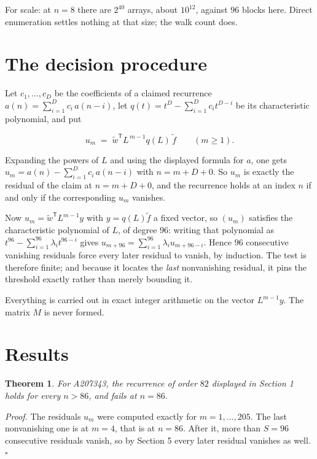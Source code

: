 \documentclass[11pt]{article}
\newtheorem{theorem}{Theorem}
\theoremstyle{definition}
\begin{document}
For scale: at $n = 8$ there are $2^{40}$ arrays, about $10^{12}$, against $96$ blocks here. Direct enumeration settles nothing at that size; the walk count does.

\section{The decision procedure}

Let $c_1,\dots,c_D$ be the coefficients of a claimed recurrence $a(n) = \sum_{i=1}^{D} c_i\,a(n-i)$, let $q(t) = t^{D} - \sum_{i=1}^{D} c_i t^{D-i}$ be its characteristic polynomial, and put

\[u_m \;=\; \tilde w^{\mathsf T} L^{\,m-1} q(L)\,\tilde f \qquad (m \ge 1).\]

Expanding the powers of $L$ and using the displayed formula for $a$, one gets $u_m = a(n) - \sum_{i=1}^{D} c_i\,a(n-i)$ with $n = m + D + 0$. So $u_m$ is exactly the residual of the claim at $n = m + D + 0$, and the recurrence holds at an index $n$ if and only if the corresponding $u_m$ vanishes.

Now $u_m = \tilde w^{\mathsf T} L^{m-1} y$ with $y = q(L)\tilde f$ a fixed vector, so $(u_m)$ satisfies the characteristic polynomial of $L$, of degree $96$: writing that polynomial as $t^{96} - \sum_{i=1}^{96} \lambda_i t^{96-i}$ gives $u_{m+96} = \sum_{i=1}^{96} \lambda_i u_{m+96-i}$. Hence $96$ consecutive vanishing residuals force every later residual to vanish, by induction. The test is therefore finite; and because it locates the {\itshape last} nonvanishing residual, it pins the threshold exactly rather than merely bounding it.

Everything is carried out in exact integer arithmetic on the vector $L^{m-1}y$. The matrix $M$ is never formed.

\section{Results}

\begin{theorem} For A207343, the recurrence of order $82$ displayed in Section 1 holds for every $n > 86$, and fails at $n = 86$.\end{theorem}

{\itshape Proof.} The residuals $u_m$ were computed exactly for $m = 1,\dots,205$. The last nonvanishing one is at $m = 4$, that is at $n = 86$. After it, more than $S = 96$ consecutive residuals vanish, so by Section 5 every later residual vanishes as well. $\square$
\end{document}
